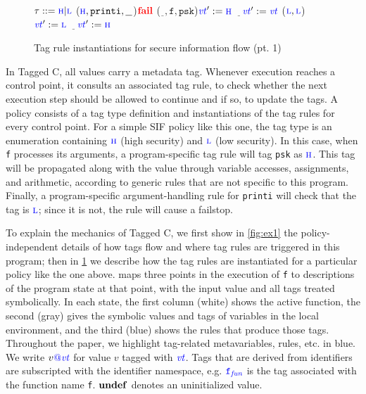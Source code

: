 \documentclass{llncs}
\begin{document}
\begin{figure}[t]
    \(\tau::=\high | \low\)
    \argtexruleblock
        {\caseofthree{\((\vt,\FN,\AN)\)}
          {(\(\high,\mathtt{printi},\underline{~~}\))}{\(\fail\)}
          {(\(\underline{~~},\mathtt{f},\mathtt{psk}\))}{\(\vt':=\high\)}
          {\(\underline{~~~}\)}{\(\vt':=\vt\)}}
    \binoptexruleblock
        {\caseoftwo{\((\vt[_1],\vt[_2])\)}
          {(\(\low,\low\))}{\(\vt':=\low\)}
          {\(\underline{~~~}\)}{\(\vt':=\high\)}}

  \caption{Tag rule instantiations for secure information flow (pt. 1)}
  \label{fig:example1rules}
\end{figure}

In Tagged C, all values carry a metadata tag. Whenever execution reaches a control point, it consults
an associated tag rule, to check whether the next execution step should be allowed to continue and
if so, to update the tags. A policy consists of a tag type definition and instantiations of the tag rules for every control point.
For a simple SIF policy like this one, the tag type is an enumeration containing \(\high\) (high security)
and \(\low\) (low security).
In this case, when {\tt f} processes its arguments, a program-specific tag rule 
will tag {\tt psk} as \(\high\). This tag will be propagated along with the value through variable accesses,
assignments, and arithmetic, according to generic rules that are not specific to this program.
Finally, a program-specific argument-handling rule for {\tt printi} will check that the tag is \(\low\);
since it is not, the rule will cause a failstop.

To explain the mechanics of Tagged C, we first show in \cref{fig:ex1} the policy-independent details of how
tags flow and where tag rules are triggered in this program; then in \cref{fig:example1rules}
we describe how the tag rules are instantiated for a particular policy like the one above.
 maps three points in the execution of {\tt f} to descriptions of the program
state at that point, with the input value and all tags treated symbolically.
In each state, the first column (white) shows the active function, the second (gray) gives the symbolic values and tags
of variables in the local environment, and the third (blue) shows the rules that produce those tags.
Throughout the paper, we highlight tag-related metavariables, rules, etc. in {\color{blue}blue}.
We write \(v\tagat \vt\) for value \(v\) tagged with \(\vt\).
Tags that are derived from identifiers are subscripted with the identifier namespace, e.g.
\(\FN[f]\) is the tag associated with the function name {\tt f}.  
\(\vundef\) denotes an uninitialized value.
\end{document}
